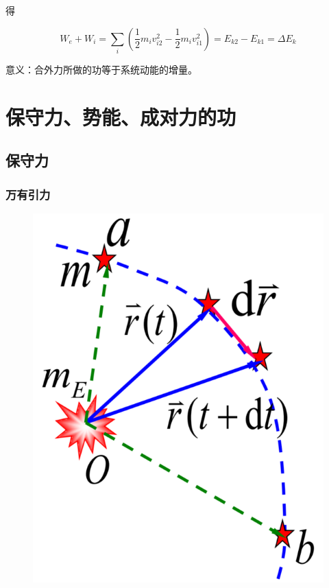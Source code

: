 \documentclass[12pt, a4paper]{article}
\numberwithin{equation}{section}
\begin{document}
    得

    \begin{equation}
        W_e+W_i=\sum_i\left(\frac{1}{2} m_i v_{i 2}^2-\frac{1}{2} m_i v_{i 1}^2\right)=E_{k 2}-E_{k 1}=\Delta E_k
    \end{equation}

    意义：合外力所做的功等于系统动能的增量。

\section{保守力、势能、成对力的功}

\subsection{保守力}

\subsubsection{万有引力}

    \begin{figure}
        \centering
        \includegraphics[scale=0.2]{"Chapter 03 images/pic4.png"}
        \label{pic4}
    \end{figure}
\end{document}
